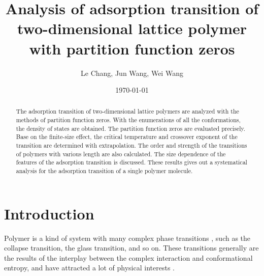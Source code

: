 \documentclass[aps,pre,twocolumn,showpacs,preprintnumbers,amsmath,amssymb]{revtex4-1}
\begin{document}
\title{Analysis of adsorption transition of two-dimensional lattice
polymer with partition function zeros}
\author{Le Chang, Jun Wang, Wei Wang}


\date{\today}

\begin{abstract}
The adsorption transition of two-dimensional lattice polymers are
analyzed with the methods of partition function zeros. With the
enumerations of all the conformations, the density of states are
obtained. The partition function zeros are evaluated precisely.
Base on the finite-size effect, the critical temperature and crossover
exponent of the transition are determined with extrapolation. The
order and strength of the transitions of polymers with various length
are also calculated. The size dependence of the features of the
adsorption transition is discussed. These results gives out a systematical
analysis for the adsorption transition of a single polymer molecule.
\end{abstract}


\maketitle

\section{Introduction}

Polymer is a kind of system with many complex phase transitions
\cite{LifshitzRMP78,PrivmanBook81,ChengBook08,deGennesBook79,PhysRep},
such as the collapse transition\cite{FloryJCP49,
FloryBOOK67,WilliamsARPC81,OYJCP08}, the glass transition\cite{GibbsJCP58,
JackleRPP86}, and so on. These transitions generally are the results
of the interplay between the complex interaction and conformational
entropy, and have attracted a lot of physical interests
\cite{LifshitzRMP78,FloryJCP49,FloryBOOK67,WilliamsARPC81,GibbsJCP58,
JackleRPP86,deGennesBook79,StephenPLA75,RigByJCP1987,BellRMP93,
ChengARMR,PrivmanBook81,ZivPCCP09,ChengBook08,PCCP10,JCP09,JCP09b,JCP10,
PRL95,PhysRep,OYJCP08,BinderBook95}.
\end{document}

